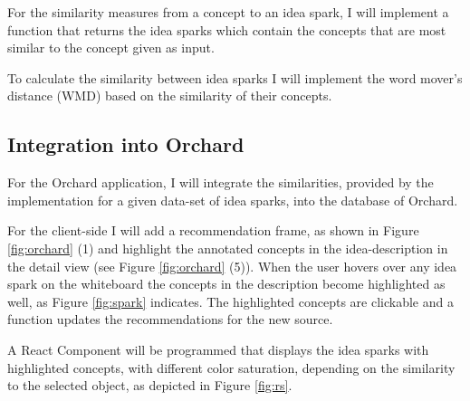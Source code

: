 \documentclass[pdftex,a4paper,12pt]{scrartcl}
\theoremstyle{definition}
\begin{document}
    For the similarity measures from a concept to an idea spark, I will implement a function that returns the idea sparks which contain the concepts that are most similar to the concept given as input. 
    
    To calculate the similarity between idea sparks I will implement the word mover's distance (WMD) \citep{kusner_word_2015} based on the similarity of their concepts. 
    
    \subsection{Integration into Orchard}
    
    For the Orchard application, I will integrate the similarities, provided by the implementation for a given data-set of idea sparks, into the database of Orchard. 

    For the client-side I will add a recommendation frame, as shown in Figure \ref{fig:orchard} (1) and highlight the annotated concepts in the idea-description in the detail view (see Figure \ref{fig:orchard} (5)). When the user hovers over any idea spark on the whiteboard the concepts in the description become highlighted as well, as Figure \ref{fig:spark} indicates. The highlighted concepts are clickable and a function updates the recommendations for the new source. 

    A React Component will be programmed that displays the idea sparks with highlighted concepts, with different color saturation, depending on the similarity to the selected object, as depicted in Figure \ref{fig:rs}.
    
\end{document}
